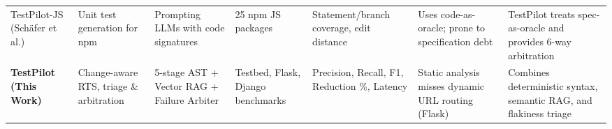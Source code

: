 \begin{table}[t]
\begin{tabular}{lp{2.2cm}p{2.8cm}p{2.4cm}p{2.2cm}p{2.2cm}p{2.5cm}}
\addlinespace
TestPilot-JS (Sch{\"a}fer et al.)~\cite{schafer2024empirical} & Unit test generation for npm & Prompting LLMs with code signatures & 25 npm JS packages & Statement/branch coverage, edit distance & Uses code-as-oracle; prone to specification debt & TestPilot treats spec-as-oracle and provides 6-way arbitration \\
\addlinespace
\textbf{TestPilot (This Work)} & Change-aware RTS, triage \& arbitration & 5-stage AST + Vector RAG + Failure Arbiter & Testbed, Flask, Django benchmarks & Precision, Recall, F1, Reduction \%, Latency & Static analysis misses dynamic URL routing (Flask) & Combines deterministic syntax, semantic RAG, and flakiness triage \\
\bottomrule
\end{tabular}
\end{table}
